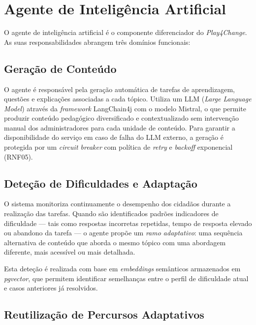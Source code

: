 \section{Agente de Inteligência Artificial}
\label{sec:agente_ia}

O agente de inteligência artificial é o componente diferenciador do \textit{Play4Change}. As suas responsabilidades abrangem três domínios funcionais:

\subsection{Geração de Conteúdo}
\label{ssec:geracao_conteudo}

O agente é responsável pela geração automática de tarefas de aprendizagem, questões e explicações associadas a cada tópico. Utiliza um LLM (\textit{Large Language Model}) através da \textit{framework} LangChain4j com o modelo Mistral, o que permite produzir conteúdo pedagógico diversificado e contextualizado sem intervenção manual dos administradores para cada unidade de conteúdo. Para garantir a disponibilidade do serviço em caso de falha do LLM externo, a geração é protegida por um \textit{circuit breaker} com política de \textit{retry} e \textit{backoff} exponencial (RNF05).

\subsection{Deteção de Dificuldades e Adaptação}
\label{ssec:detecao_dificuldades}

O sistema monitoriza continuamente o desempenho dos cidadãos durante a realização das tarefas. Quando são identificados padrões indicadores de dificuldade --- tais como respostas incorretas repetidas, tempo de resposta elevado ou abandono da tarefa --- o agente propõe um \textit{ramo adaptativo}: uma sequência alternativa de conteúdo que aborda o mesmo tópico com uma abordagem diferente, mais acessível ou mais detalhada.

Esta deteção é realizada com base em \textit{embeddings} semânticos armazenados em \textit{pgvector}, que permitem identificar semelhanças entre o perfil de dificuldade atual e casos anteriores já resolvidos.

\subsection{Reutilização de Percursos Adaptativos}
\label{ssec:reutilizacao}


